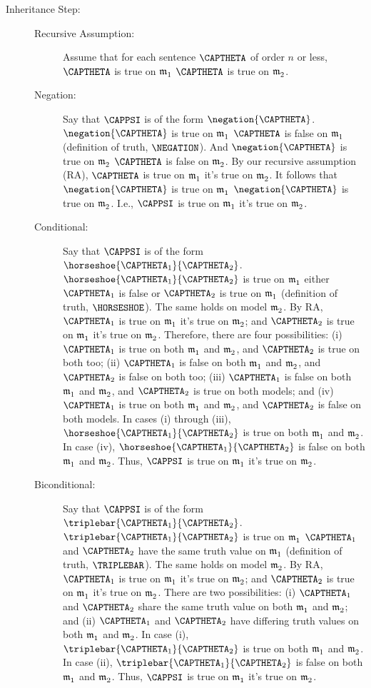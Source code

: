 \begin{PROOF}
\begin{description}
		\item[Inheritance Step:] 
		\begin{description}
			\item[Recursive Assumption:] Assume that for each sentence $\CAPTHETA$ of order $n$ or less, $\CAPTHETA$ is true on $\mathfrak{m^{\mathrm{}}_{\mathrm{1}}}$ \Iff $\CAPTHETA$ is true on $\mathfrak{m^{\mathrm{}}_{\mathrm{2}}}$.
			\item[Negation:] Say that $\CAPPSI$ is of the form $\negation{\CAPTHETA}$.  $\negation{\CAPTHETA}$ is true on $\mathfrak{m^{\mathrm{}}_{\mathrm{1}}}$ \Iff $\CAPTHETA$ is false on $\mathfrak{m^{\mathrm{}}_{\mathrm{1}}}$ (definition of truth, $\NEGATION$).  And $\negation{\CAPTHETA}$ is true on $\mathfrak{m^{\mathrm{}}_{\mathrm{2}}}$ \Iff $\CAPTHETA$ is false on $\mathfrak{m^{\mathrm{}}_{\mathrm{2}}}$.  By our recursive assumption (RA), $\CAPTHETA$ is true on $\mathfrak{m^{\mathrm{}}_{\mathrm{1}}}$ \Iff it's true on $\mathfrak{m^{\mathrm{}}_{\mathrm{2}}}$.  It follows that $\negation{\CAPTHETA}$ is true on $\mathfrak{m^{\mathrm{}}_{\mathrm{1}}}$ \Iff $\negation{\CAPTHETA}$ is true on $\mathfrak{m^{\mathrm{}}_{\mathrm{2}}}$. I.e., $\CAPPSI$ is true on $\mathfrak{m^{\mathrm{}}_{\mathrm{1}}}$ \Iff it's true on $\mathfrak{m^{\mathrm{}}_{\mathrm{2}}}$.
			\item[Conditional:] Say that $\CAPPSI$ is of the form $\horseshoe{\CAPTHETA_1}{\CAPTHETA_2}$.  $\horseshoe{\CAPTHETA_1}{\CAPTHETA_2}$ is true on $\mathfrak{m^{\mathrm{}}_{\mathrm{1}}}$ \Iff either $\CAPTHETA_1$ is false or $\CAPTHETA_2$ is true on $\mathfrak{m^{\mathrm{}}_{\mathrm{1}}}$ (definition of truth, $\HORSESHOE$).  The same holds on model $\mathfrak{m^{\mathrm{}}_{\mathrm{2}}}$.  By RA, $\CAPTHETA_1$ is true on $\mathfrak{m^{\mathrm{}}_{\mathrm{1}}}$ \Iff it's true on $\mathfrak{m^{\mathrm{}}_{\mathrm{2}}}$; and $\CAPTHETA_2$ is true on $\mathfrak{m^{\mathrm{}}_{\mathrm{1}}}$ \Iff it's true on $\mathfrak{m^{\mathrm{}}_{\mathrm{2}}}$.  Therefore, there are four possibilities:  (i) $\CAPTHETA_1$ is true on both $\mathfrak{m^{\mathrm{}}_{\mathrm{1}}}$ and $\mathfrak{m^{\mathrm{}}_{\mathrm{2}}}$, and $\CAPTHETA_2$ is true on both too; (ii) $\CAPTHETA_1$ is false on both $\mathfrak{m^{\mathrm{}}_{\mathrm{1}}}$ and $\mathfrak{m^{\mathrm{}}_{\mathrm{2}}}$, and $\CAPTHETA_2$ is false on both too; (iii) $\CAPTHETA_1$ is false on both $\mathfrak{m^{\mathrm{}}_{\mathrm{1}}}$ and $\mathfrak{m^{\mathrm{}}_{\mathrm{2}}}$, and $\CAPTHETA_2$ is true on both models; and (iv) $\CAPTHETA_1$ is true on both $\mathfrak{m^{\mathrm{}}_{\mathrm{1}}}$ and $\mathfrak{m^{\mathrm{}}_{\mathrm{2}}}$, and $\CAPTHETA_2$ is false on both models.  In cases (i) through (iii), $\horseshoe{\CAPTHETA_1}{\CAPTHETA_2}$ is true on both $\mathfrak{m^{\mathrm{}}_{\mathrm{1}}}$ and $\mathfrak{m^{\mathrm{}}_{\mathrm{2}}}$.  In case (iv), $\horseshoe{\CAPTHETA_1}{\CAPTHETA_2}$ is false on both $\mathfrak{m^{\mathrm{}}_{\mathrm{1}}}$ and $\mathfrak{m^{\mathrm{}}_{\mathrm{2}}}$.  Thus, $\CAPPSI$ is true on $\mathfrak{m^{\mathrm{}}_{\mathrm{1}}}$ \Iff it's true on $\mathfrak{m^{\mathrm{}}_{\mathrm{2}}}$.
			\item[Biconditional:] Say that $\CAPPSI$ is of the form $\triplebar{\CAPTHETA_1}{\CAPTHETA_2}$.  $\triplebar{\CAPTHETA_1}{\CAPTHETA_2}$ is true on $\mathfrak{m^{\mathrm{}}_{\mathrm{1}}}$ \Iff $\CAPTHETA_1$ and $\CAPTHETA_2$ have the same truth value on $\mathfrak{m^{\mathrm{}}_{\mathrm{1}}}$ (definition of truth, $\TRIPLEBAR$).  The same holds on model $\mathfrak{m^{\mathrm{}}_{\mathrm{2}}}$.  By RA, $\CAPTHETA_1$ is true on $\mathfrak{m^{\mathrm{}}_{\mathrm{1}}}$ \Iff it's true on $\mathfrak{m^{\mathrm{}}_{\mathrm{2}}}$; and $\CAPTHETA_2$ is true on $\mathfrak{m^{\mathrm{}}_{\mathrm{1}}}$ \Iff it's true on $\mathfrak{m^{\mathrm{}}_{\mathrm{2}}}$.  There are two possibilities: (i) $\CAPTHETA_1$ and $\CAPTHETA_2$ share the same truth value on both $\mathfrak{m^{\mathrm{}}_{\mathrm{1}}}$ and $\mathfrak{m^{\mathrm{}}_{\mathrm{2}}}$; and (ii) $\CAPTHETA_1$ and $\CAPTHETA_2$ have differing truth values on both $\mathfrak{m^{\mathrm{}}_{\mathrm{1}}}$ and $\mathfrak{m^{\mathrm{}}_{\mathrm{2}}}$.  In case (i), $\triplebar{\CAPTHETA_1}{\CAPTHETA_2}$ is true on both $\mathfrak{m^{\mathrm{}}_{\mathrm{1}}}$ and $\mathfrak{m^{\mathrm{}}_{\mathrm{2}}}$.  In case (ii), $\triplebar{\CAPTHETA_1}{\CAPTHETA_2}$ is false on both $\mathfrak{m^{\mathrm{}}_{\mathrm{1}}}$ and $\mathfrak{m^{\mathrm{}}_{\mathrm{2}}}$.  Thus, $\CAPPSI$ is true on $\mathfrak{m^{\mathrm{}}_{\mathrm{1}}}$ \Iff it's true on $\mathfrak{m^{\mathrm{}}_{\mathrm{2}}}$.

\end{description}
\end{description}
\end{PROOF}
